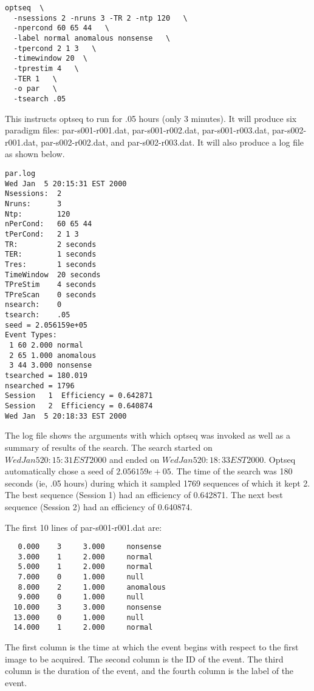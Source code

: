 \documentclass[10pt]{article}
\begin{document}
\begin{small}
\begin{verbatim}
optseq  \
  -nsessions 2 -nruns 3 -TR 2 -ntp 120   \
  -npercond 60 65 44   \
  -label normal anomalous nonsense   \
  -tpercond 2 1 3   \
  -timewindow 20  \
  -tprestim 4   \
  -TER 1   \
  -o par   \
  -tsearch .05 
\end{verbatim}
\end{small}

This instructs optseq to run for .05 hours (only 3 minutes).  It will
produce six paradigm files: par-s001-r001.dat, par-s001-r002.dat,
par-s001-r003.dat, par-s002-r001.dat, par-s002-r002.dat, and
par-s002-r003.dat. It will also produce a log file as shown below.

\begin{small}
\begin{verbatim}
par.log
Wed Jan  5 20:15:31 EST 2000
Nsessions:  2
Nruns:      3
Ntp:        120
nPerCond:   60 65 44
tPerCond:   2 1 3
TR:         2 seconds
TER:        1 seconds
Tres:       1 seconds
TimeWindow  20 seconds
TPreStim    4 seconds
TPreScan    0 seconds
nsearch:    0
tsearch:    .05
seed = 2.056159e+05
Event Types:
 1 60 2.000 normal   
 2 65 1.000 anomalous
 3 44 3.000 nonsense 
tsearched = 180.019
nsearched = 1796
Session   1  Efficiency = 0.642871
Session   2  Efficiency = 0.640874
Wed Jan  5 20:18:33 EST 2000
\end{verbatim}
\end{small}

The log file shows the arguments with which optseq was invoked as well
as a summary of results of the search.  The search started on $Wed Jan
5 20:15:31 EST 2000$ and ended on $Wed Jan 5 20:18:33 EST 2000$.
Optseq automatically chose a seed of $2.056159e+05$.  The time of the
search was 180 seconds (ie, .05 hours) during which it sampled 1769
sequences of which it kept 2.  The best sequence (Session 1) had an
efficiency of 0.642871. The next best sequence (Session 2) had an
efficiency of 0.640874.

The first 10 lines of par-s001-r001.dat are:

\begin{small}
\begin{verbatim}
   0.000    3     3.000     nonsense
   3.000    1     2.000     normal
   5.000    1     2.000     normal
   7.000    0     1.000     null
   8.000    2     1.000     anomalous
   9.000    0     1.000     null
  10.000    3     3.000     nonsense
  13.000    0     1.000     null
  14.000    1     2.000     normal
\end{verbatim}
\end{small}

The first column is the time at which the event begins with respect to
the first image to be acquired.  The second column is the ID of the
event.  The third column is the duration of the event, and the fourth
column is the label of the event.
\end{document}
